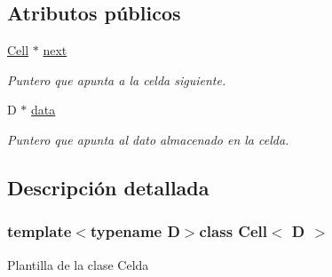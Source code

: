 \subsection*{Atributos públicos}
\begin{DoxyCompactItemize}
\item 
\hypertarget{class_cell_a7e0e6c090f8aca70862c2dbc3257e3b9}{\hyperlink{class_cell}{Cell} $\ast$ \hyperlink{class_cell_a7e0e6c090f8aca70862c2dbc3257e3b9}{next}}\label{class_cell_a7e0e6c090f8aca70862c2dbc3257e3b9}

\begin{DoxyCompactList}\small\item\em Puntero que apunta a la celda siguiente. \end{DoxyCompactList}\item 
\hypertarget{class_cell_ab8cc4d3059ef84a652eabc05b6c28f49}{D $\ast$ \hyperlink{class_cell_ab8cc4d3059ef84a652eabc05b6c28f49}{data}}\label{class_cell_ab8cc4d3059ef84a652eabc05b6c28f49}

\begin{DoxyCompactList}\small\item\em Puntero que apunta al dato almacenado en la celda. \end{DoxyCompactList}\end{DoxyCompactItemize}


\subsection{Descripción detallada}
\subsubsection*{template$<$typename D$>$class Cell$<$ D $>$}

Plantilla de la clase Celda 

